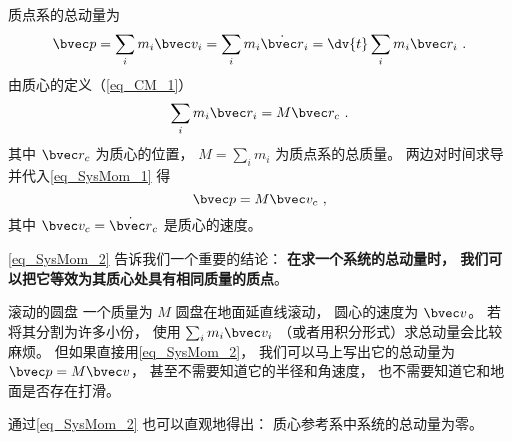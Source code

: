 

质点系的总动量为
\begin{equation}\label{eq_SysMom_1}
\bvec p = \sum_i m_i \bvec v_i = \sum_i m_i \dot{\bvec r}_i = \dv{t}  \sum_i m_i \bvec r_i~.
\end{equation}
由质心的定义（\autoref{eq_CM_1}） 
\begin{equation}
\sum_i m_i \bvec r_i = M \bvec r_c~.
\end{equation}
其中 $\bvec r_c$ 为质心的位置， $M = \sum_i m_i$ 为质点系的总质量。 两边对时间求导并代入\autoref{eq_SysMom_1} 得
\begin{equation}\label{eq_SysMom_2}
\bvec p = M\bvec v_c~,
\end{equation}
其中 $\bvec v_c = \dot{\bvec r}_c$ 是质心的速度。

\autoref{eq_SysMom_2} 告诉我们一个重要的结论： \textbf{在求一个系统的总动量时， 我们可以把它等效为其质心处具有相同质量的质点}。

\begin{example}{滚动的圆盘}
一个质量为 $M$ 圆盘在地面延直线滚动， 圆心的速度为 $\bvec v$。 若将其分割为许多小份， 使用 $\sum_i m_i \bvec v_i$ （或者用积分形式）求总动量会比较麻烦。 但如果直接用\autoref{eq_SysMom_2}， 我们可以马上写出它的总动量为 $\bvec p = M\bvec v$， 甚至不需要知道它的半径和角速度， 也不需要知道它和地面是否存在打滑。
\end{example}

通过\autoref{eq_SysMom_2} 也可以直观地得出： 质心参考系中系统的总动量为零。
